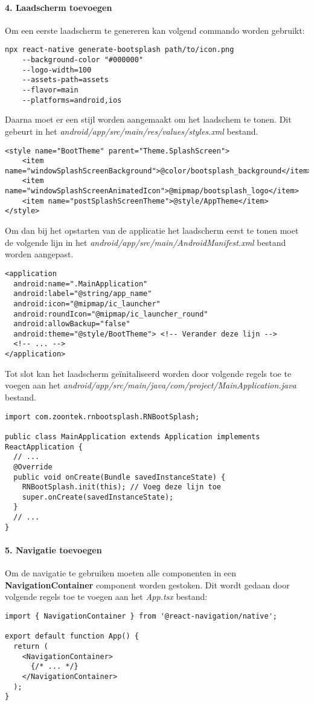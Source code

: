 \paragraph{4. Laadscherm toevoegen}
Om een eerste laadscherm te genereren kan volgend commando worden gebruikt:
\begin{verbatim}
npx react-native generate-bootsplash path/to/icon.png
    --background-color "#000000" 
    --logo-width=100 
    --assets-path=assets 
    --flavor=main 
    --platforms=android,ios
\end{verbatim}
Daarna moet er een stijl worden aangemaakt om het laadschem te tonen. Dit gebeurt in 
het \textit{android/app/src/main/res/values/styles.xml} bestand.
\begin{verbatim}
<style name="BootTheme" parent="Theme.SplashScreen">
    <item name="windowSplashScreenBackground">@color/bootsplash_background</item>
    <item name="windowSplashScreenAnimatedIcon">@mipmap/bootsplash_logo</item>
    <item name="postSplashScreenTheme">@style/AppTheme</item>
</style>
\end{verbatim}
Om dan bij het opstarten van de applicatie het laadscherm eerst te tonen moet de volgende 
lijn in het \textit{android/app/src/main/AndroidManifest.xml} bestand worden aangepast.
\begin{verbatim}
<application
  android:name=".MainApplication"
  android:label="@string/app_name"
  android:icon="@mipmap/ic_launcher"
  android:roundIcon="@mipmap/ic_launcher_round"
  android:allowBackup="false"
  android:theme="@style/BootTheme"> <!-- Verander deze lijn -->
  <!-- ... -->
</application>
\end{verbatim}
Tot slot kan het laadscherm geïnitaliseerd worden door volgende regels toe te voegen aan het
\textit{android/app/src/main/java/com/project/MainApplication.java} bestand.
\begin{verbatim}
import com.zoontek.rnbootsplash.RNBootSplash;

public class MainApplication extends Application implements ReactApplication {
  // ...
  @Override
  public void onCreate(Bundle savedInstanceState) {
    RNBootSplash.init(this); // Voeg deze lijn toe
    super.onCreate(savedInstanceState);
  }
  // ...
}
\end{verbatim}

\paragraph{5. Navigatie toevoegen}
Om de navigatie te gebruiken moeten alle componenten in een 
\textbf{NavigationContainer} component worden gestoken. Dit wordt gedaan door volgende regels toe te voegen
aan het \textit{App.tsx} bestand:
\begin{verbatim}
import { NavigationContainer } from '@react-navigation/native';

export default function App() {
  return (
    <NavigationContainer>
      {/* ... */}
    </NavigationContainer>
  );
}
\end{verbatim}

